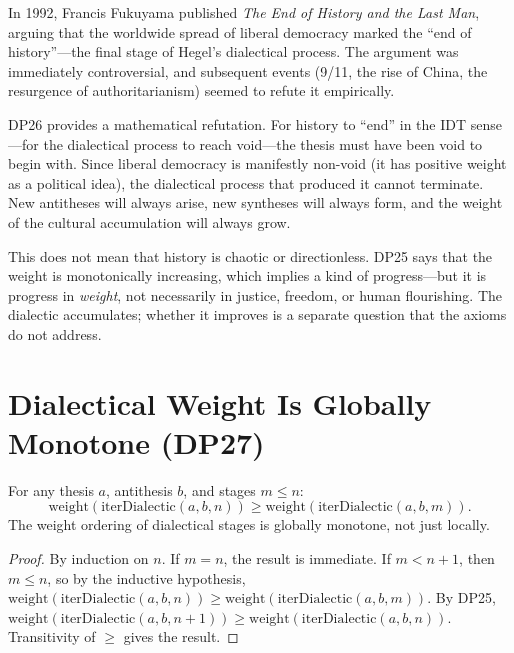 \begin{interpretation}
\label{interp:fukuyama-refuted}
In 1992, Francis Fukuyama published \textit{The End of History and the
Last Man}, arguing that the worldwide spread of liberal democracy
marked the ``end of history''---the final stage of Hegel's dialectical
process.  The argument was immediately controversial, and subsequent
events (9/11, the rise of China, the resurgence of authoritarianism)
seemed to refute it empirically.

DP26 provides a mathematical refutation.  For history to ``end'' in
the IDT sense---for the dialectical process to reach void---the thesis
must have been void to begin with.  Since liberal democracy is
manifestly non-void (it has positive weight as a political idea),
the dialectical process that produced it cannot terminate.  New
antitheses will always arise, new syntheses will always form, and
the weight of the cultural accumulation will always grow.

This does not mean that history is chaotic or directionless.  DP25
says that the weight is monotonically increasing, which implies a
kind of progress---but it is progress in \emph{weight}, not
necessarily in justice, freedom, or human flourishing.  The dialectic
accumulates; whether it improves is a separate question that the
axioms do not address.
\end{interpretation}

\section{Dialectical Weight Is Globally Monotone (DP27)}

\begin{theorem}
\label{thm:dialectical-transitive}
For any thesis $a$, antithesis $b$, and stages $m \leq n$:
\[
\mathrm{weight}(\mathrm{iterDialectic}(a, b, n)) \geq
\mathrm{weight}(\mathrm{iterDialectic}(a, b, m)).
\]
The weight ordering of dialectical stages is globally monotone, not just
locally.
\end{theorem}

\begin{proof}
By induction on $n$.  If $m = n$, the result is immediate.  If $m < n+1$,
then $m \leq n$, so by the inductive hypothesis,
$\mathrm{weight}(\mathrm{iterDialectic}(a,b,n)) \geq
\mathrm{weight}(\mathrm{iterDialectic}(a,b,m))$.  By DP25,
$\mathrm{weight}(\mathrm{iterDialectic}(a,b,n+1)) \geq
\mathrm{weight}(\mathrm{iterDialectic}(a,b,n))$.  Transitivity of $\geq$
gives the result.
\end{proof}


